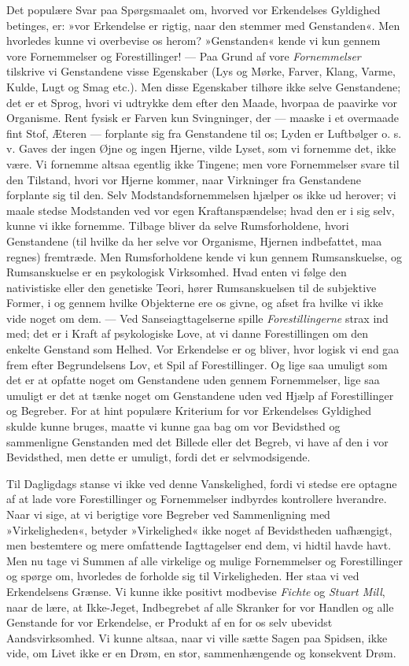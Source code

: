 \documentclass[12pt,a4paper,openany]{book}
\newcommand{\opage}[1]{\marginnote{\footnotesize\textit{[#1]}}}
\begin{document}
Det populære Svar paa Spørgsmaalet om, hvorved vor Erkendelses Gyldighed
betinges, er: »vor Erkendelse er rigtig, naar den stemmer med
Genstanden«. Men hvorledes kunne vi overbevise os herom? »Genstanden«
kende vi kun gennem vore Fornemmelser og Forestillinger! --- Paa Grund
af vore \emph{Fornemmelser} tilskrive vi Genstandene visse Egenskaber
(Lys og Mørke, Farver, Klang, Varme, Kulde, Lugt og Smag etc.). Men
disse Egenskaber tilhøre ikke selve Genstandene; det er et Sprog, hvori
vi udtrykke dem efter den Maade, hvorpaa de paavirke vor Organisme. Rent
fysisk er Farven kun Svingninger, der --- maaske i et overmaade fint
Stof, Æteren --- forplante sig fra Genstandene til os; Lyden er
Luftbølger o. s. v. Gaves der ingen Øjne og ingen Hjerne, vilde Lyset,
som vi fornemme det, ikke være. Vi fornemme altsaa egentlig ikke
Tingene; men vore Fornemmelser svare til den Tilstand, hvori vor Hjerne
kommer, naar Virkninger fra Genstandene forplante sig til den. Selv
Modstandsfornemmelsen hjælper os ikke ud herover; vi maale stedse
Modstanden ved vor egen Kraftanspændelse; hvad den er i sig selv, kunne
vi ikke fornemme. Tilbage bliver da selve Rumsforholdene, hvori
Genstandene (til hvilke da her selve vor Organisme, Hjernen indbefattet,
maa regnes) fremtræde. Men
\opage{265}Rumsforholdene kende vi kun gennem Rumsanskuelse, og
Rumsanskuelse er en psykologisk Virksomhed. Hvad enten vi følge den
nativistiske eller den genetiske Teori, hører Rumsanskuelsen til de
subjektive Former, i og gennem hvilke Objekterne ere os givne, og afset
fra hvilke vi ikke vide noget om dem. --- Ved Sanseiagttagelserne spille
\emph{Forestillingerne} strax ind med; det er i Kraft af psykologiske
Love, at vi danne Forestillingen om den enkelte Genstand som Helhed. Vor
Erkendelse er og bliver, hvor logisk vi end gaa frem efter Begrundelsens
Lov, et Spil af Forestillinger. Og lige saa umuligt som det er at
opfatte noget om Genstandene uden gennem Fornemmelser, lige saa umuligt
er det at tænke noget om Genstandene uden ved Hjælp af Forestillinger og
Begreber. For at hint populære Kriterium for vor Erkendelses Gyldighed
skulde kunne bruges, maatte vi kunne gaa bag om vor Bevidsthed og
sammenligne Genstanden med det Billede eller det Begreb, vi have af den
i vor Bevidsthed, men dette er umuligt, fordi det er selvmodsigende.

Til Dagligdags stanse vi ikke ved denne Vanskelighed, fordi vi stedse
ere optagne af at lade vore Forestillinger og Fornemmelser indbyrdes
kontrollere hverandre. Naar vi sige, at vi berigtige vore Begreber ved
Sammenligning med »Virkeligheden«, betyder »Virkelighed« ikke noget af
Bevidstheden uafhængigt, men bestemtere og mere omfattende Iagttagelser
end dem, vi hidtil havde havt. Men nu tage vi Summen af alle virkelige
og mulige Fornemmelser og Forestillinger og spørge om, hvorledes de
forholde sig til Virkeligheden. Her staa vi ved Erkendelsens Grænse. Vi
kunne ikke positivt modbevise \emph{Fichte} og \emph{Stuart Mill}, naar
de lære, at Ikke-Jeget, Indbegrebet af alle Skranker for vor Handlen og
alle Genstande for vor Erkendelse, er Produkt af en for os selv ubevidst
Aandsvirksomhed. Vi kunne altsaa, naar vi ville sætte Sagen paa Spidsen,
ikke vide, om Livet ikke er en Drøm, en stor, sammenhængende og
konsekvent Drøm.
\end{document}
